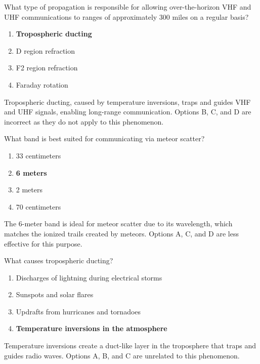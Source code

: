 
\begin{tcolorbox}[colback=gray!10!white,colframe=black!75!black,title={T3C06}]
    What type of propagation is responsible for allowing over-the-horizon VHF and UHF communications to ranges of approximately 300 miles on a regular basis?
    \begin{enumerate}[label=\Alph*,noitemsep]
        \item \textbf{Tropospheric ducting}
        \item D region refraction
        \item F2 region refraction
        \item Faraday rotation
    \end{enumerate}
\end{tcolorbox}
Tropospheric ducting, caused by temperature inversions, traps and guides VHF and UHF signals, enabling long-range communication. Options B, C, and D are incorrect as they do not apply to this phenomenon.


\begin{tcolorbox}[colback=gray!10!white,colframe=black!75!black,title={T3C07}]
    What band is best suited for communicating via meteor scatter?
    \begin{enumerate}[label=\Alph*,noitemsep]
        \item 33 centimeters
        \item \textbf{6 meters}
        \item 2 meters
        \item 70 centimeters
    \end{enumerate}
\end{tcolorbox}
The 6-meter band is ideal for meteor scatter due to its wavelength, which matches the ionized trails created by meteors. Options A, C, and D are less effective for this purpose.


\begin{tcolorbox}[colback=gray!10!white,colframe=black!75!black,title={T3C08}]
    What causes tropospheric ducting?
    \begin{enumerate}[label=\Alph*,noitemsep]
        \item Discharges of lightning during electrical storms
        \item Sunspots and solar flares
        \item Updrafts from hurricanes and tornadoes
        \item \textbf{Temperature inversions in the atmosphere}
    \end{enumerate}
\end{tcolorbox}
Temperature inversions create a duct-like layer in the troposphere that traps and guides radio waves. Options A, B, and C are unrelated to this phenomenon.

